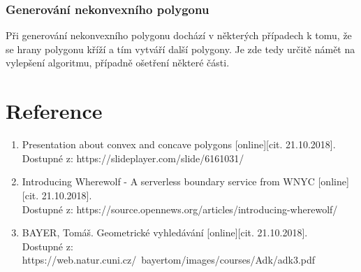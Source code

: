 \documentclass[a4paper, 12pt]{article}
\begin{document}
\subsubsection{Generování nekonvexního polygonu}
Při generování nekonvexního polygonu dochází v některých případech k tomu, že se hrany polygonu kříží a tím vytváří další polygony. Je zde tedy určitě námět na vylepšení algoritmu, případně ošetření některé části.

\clearpage
\section{Reference}

\begin{enumerate}
\item  Presentation about convex and concave polygons [online][cit. 21.10.2018]. \\
Dostupné z: https://slideplayer.com/slide/6161031/  \\
\item  Introducing Wherewolf - A serverless boundary service from WNYC [online][cit. 21.10.2018]. \\
Dostupné z: https://source.opennews.org/articles/introducing-wherewolf/  \\
\item  BAYER, Tomáš. Geometrické vyhledávání [online][cit. 21.10.2018]. \\
Dostupné z: https://web.natur.cuni.cz/~bayertom/images/courses/Adk/adk3.pdf  \\

\end{enumerate}
\end{document}
